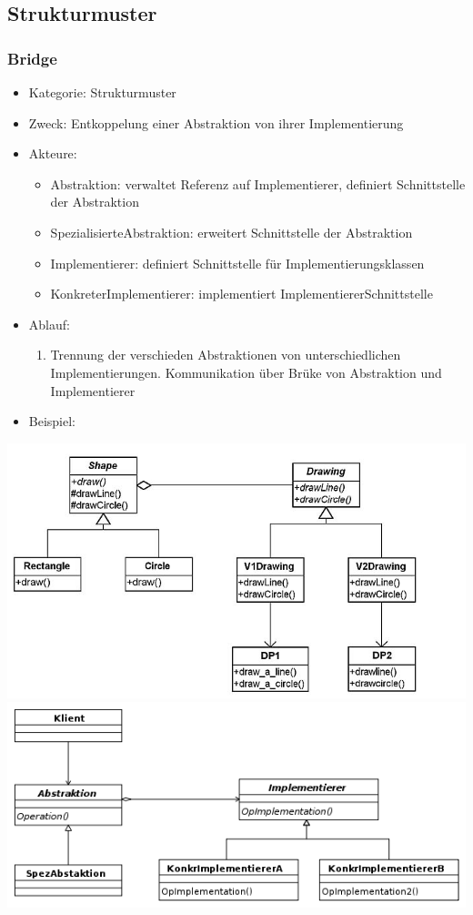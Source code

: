 \documentclass[11pt, fleqn, a4paper, leqno]{scrartcl} %
\begin{document}
		\subsection{Strukturmuster}
		\subsubsection{Bridge}
			\begin{itemize}
				\item Kategorie: Strukturmuster
				\item Zweck: Entkoppelung einer Abstraktion von ihrer Implementierung
				\item Akteure: 
				\begin{itemize}
					\item Abstraktion: verwaltet Referenz auf Implementierer, definiert Schnittstelle der Abstraktion
					\item SpezialisierteAbstraktion: erweitert Schnittstelle der Abstraktion
					\item Implementierer: definiert Schnittstelle für Implementierungsklassen
					\item KonkreterImplementierer: implementiert ImplementiererSchnittstelle
				\end{itemize}
				\item Ablauf:
				\begin{enumerate}
					\item Trennung der verschieden Abstraktionen von unterschiedlichen Implementierungen. Kommunikation über Brüke von Abstraktion und Implementierer
				\end{enumerate}
				\item Beispiel:			
			\end{itemize}
			\includegraphics[scale=0.4]{images/bridge-example.jpg}\\
			\includegraphics[scale=0.4]{images/bridge.png}
			\newpage
\end{document}

